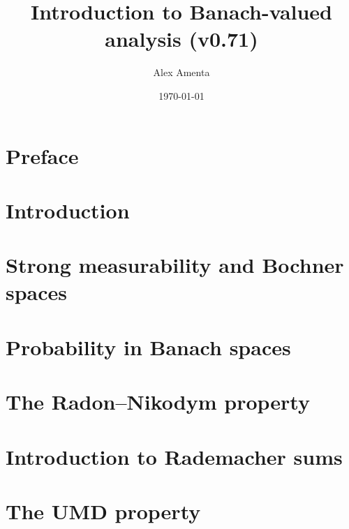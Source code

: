 \documentclass[a4paper,10pt]{amsbook}
\begin{document}
\title[Banach-valued analysis]{Introduction to Banach-valued analysis (v0.71)}
\date{\today}

\author[A. Amenta]{Alex Amenta}
\address{\noindent Mathematisches Institut \newline \indent Universit\"at Bonn, Bonn, Germany}

\maketitle
\tableofcontents


\chapter*{Preface}


\chapter{Introduction}
\label{sec:intro}


\chapter{Strong measurability and Bochner spaces}
\label{sec:Bochner-spaces}


\chapter{Probability in Banach spaces}
\label{sec:martingales} 


\chapter{The Radon--Nikodym property}
\label{sec:RNP}


\chapter{Introduction to Rademacher sums}
\label{sec:rademacher}


\chapter{The UMD property}
\label{sec:UMD}

\end{document}
